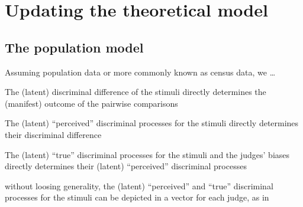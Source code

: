 \documentclass[
  authoryear,
  review,
  1p]{elsarticle}
\begin{document}
\section{Updating the theoretical model}\label{sec-theoretical}

\subsection{The population model}\label{sec-theory-theoretical_P}

Assuming population data or more commonly known as census data, we
\ldots{}

The (latent) discriminal difference of the stimuli directly determines
the (manifest) outcome of the pairwise comparisons

The (latent) ``perceived'' discriminal processes for the stimuli
directly determines their discriminal difference

The (latent) ``true'' discriminal processes for the stimuli and the
judges' biases directly determines their (latent) ``perceived''
discriminal processes

\begin{figure}


\caption{\label{fig-CJ_TM_04}}

\end{figure}%

without loosing generality, the (latent) ``perceived'' and ``true''
discriminal processes for the stimuli can be depicted in a vector for
each judge, as in

\begin{figure}


\caption{\label{fig-CJ_TM_05}}

\end{figure}%
\end{document}
